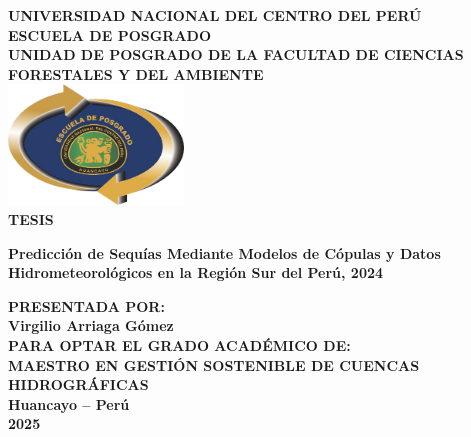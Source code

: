 \begin{titlepage}
    \centering

    \vspace*{0.5cm}
    {\Large\textbf{UNIVERSIDAD NACIONAL DEL CENTRO DEL PERÚ}}\\[0.4cm]
    {\Large\textbf{ESCUELA DE POSGRADO}}\\[0.3cm]
    {\large\textbf{UNIDAD DE POSGRADO DE LA FACULTAD DE CIENCIAS FORESTALES Y DEL AMBIENTE}}\\[1cm]

    \includegraphics[width=0.35\textwidth]{Imagen 1.png}\\[0.8cm]

    {\large\textbf{TESIS}}\\[0.8cm]

    \begin{tcolorbox}[
        colframe=black,       %
        colback=white,        %
        boxrule=0.5mm,        %
        arc=2mm,              %
        width=0.85\textwidth,  %
        left=2mm,             %
        right=2mm,
        top=2mm,              %
        bottom=2mm,           %
        boxsep=0mm,           %
        valign=center         %
    ]
    \centering
    {\Large \textbf{
    Predicción de Sequías Mediante Modelos de Cópulas y Datos Hidrometeorológicos en la Región Sur del Perú, 2024}}
    \end{tcolorbox}
    
    \vspace{0.8cm}

    {\large\textbf{PRESENTADA POR:}}\\[0.3cm]
    {\large\textbf{Virgilio Arriaga Gómez}}\\[0.8cm]

    {\large\textbf{PARA OPTAR EL GRADO ACADÉMICO DE:}}\\[0.3cm]
    {\large\textbf{MAESTRO EN GESTIÓN SOSTENIBLE DE CUENCAS HIDROGRÁFICAS}}\\[0.3cm]

    {\large\textbf{Huancayo -- Perú}}\\[0.3cm]
    {\large\textbf{2025}}\\

    \restoregeometry %
\end{titlepage}
